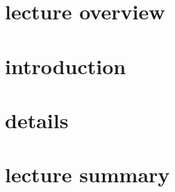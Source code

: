 

\subtitle{Part N: XXX}


	

    \section[overview]{lecture overview}
    \section[intro]{introduction}
    \section[details]{details}
    \section[summary]{lecture summary}



